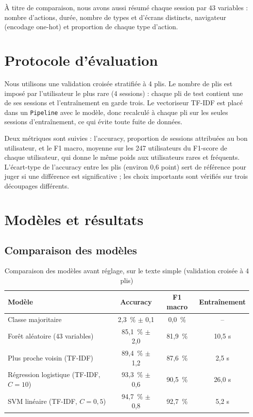 \documentclass{rapportECL}
\newcommand{\tok}[1]{\texttt{\small #1}}
\begin{document}
À titre de comparaison, nous avons aussi résumé chaque session par 43 variables : nombre d'actions, durée, nombre de types et d'écrans distincts, navigateur (encodage one-hot) et proportion de chaque type d'action.

\section{Protocole d'évaluation}

Nous utilisons une validation croisée stratifiée à 4 plis. Le nombre de plis est imposé par l'utilisateur le plus rare (4 sessions) : chaque pli de test contient une de ses sessions et l'entraînement en garde trois. Le vectoriseur TF-IDF est placé dans un \tok{Pipeline} avec le modèle, donc recalculé à chaque pli sur les seules sessions d'entraînement, ce qui évite toute fuite de données.

Deux métriques sont suivies : l'accuracy, proportion de sessions attribuées au bon utilisateur, et le F1 macro, moyenne sur les 247 utilisateurs du F1-score de chaque utilisateur, qui donne le même poids aux utilisateurs rares et fréquents. L'écart-type de l'accuracy entre les plis (environ 0,6 point) sert de référence pour juger si une différence est significative ; les choix importants sont vérifiés sur trois découpages différents.

\section{Modèles et résultats}

\subsection{Comparaison des modèles}

\begin{table}[!htbp]
\centering\small
\begin{tabular}{lccc}
\toprule
Modèle & Accuracy & F1 macro & Entraînement \\
\midrule
Classe majoritaire & 2,3~\% $\pm$ 0,1 & 0,0~\% & -- \\
Forêt aléatoire (43 variables) & 85,1~\% $\pm$ 2,0 & 81,9~\% & 10,5 s \\
Plus proche voisin (TF-IDF) & 89,4~\% $\pm$ 1,2 & 87,6~\% & 2,5 s \\
Régression logistique (TF-IDF, $C = 10$) & 93,3~\% $\pm$ 0,6 & 90,5~\% & 26,0 s \\
SVM linéaire (TF-IDF, $C = 0{,}5$) & 94,7~\% $\pm$ 0,8 & 92,7~\% & 5,2 s \\
\bottomrule
\end{tabular}
\caption{Comparaison des modèles avant réglage, sur le texte simple (validation croisée à 4 plis)}
\label{tab:modeles}
\end{table}
\end{document}
